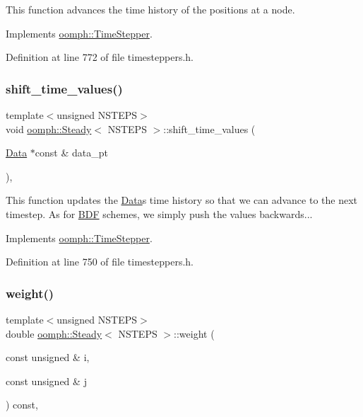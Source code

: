 This function advances the time history of the positions at a node. 



Implements \hyperlink{classoomph_1_1TimeStepper_a518b1bee5dc3aae8c5ef13560d1954ac}{oomph\+::\+Time\+Stepper}.



Definition at line 772 of file timesteppers.\+h.

\mbox{\label{classoomph_1_1Steady_aa1c00b0014a2394f7b2e1b302ebbce00}} 
\subsubsection{\texorpdfstring{shift\+\_\+time\+\_\+values()}{shift\_time\_values()}}
{\footnotesize\ttfamily template$<$unsigned N\+S\+T\+E\+PS$>$ \\
void \hyperlink{classoomph_1_1Steady}{oomph\+::\+Steady}$<$ N\+S\+T\+E\+PS $>$\+::shift\+\_\+time\+\_\+values (\begin{DoxyParamCaption}\item[{\hyperlink{classoomph_1_1Data}{Data} $\ast$const \&}]{data\+\_\+pt }\end{DoxyParamCaption})\hspace{0.3cm}{\ttfamily [inline]}, {\ttfamily [virtual]}}



This function updates the \hyperlink{classoomph_1_1Data}{Data}\textquotesingle{}s time history so that we can advance to the next timestep. As for \hyperlink{classoomph_1_1BDF}{B\+DF} schemes, we simply push the values backwards... 



Implements \hyperlink{classoomph_1_1TimeStepper_a010a3b03a23a1c48dd8ca10641427255}{oomph\+::\+Time\+Stepper}.



Definition at line 750 of file timesteppers.\+h.

\mbox{\label{classoomph_1_1Steady_a34c993309f0a5c4c1cbf35ceef86f01b}} 
\subsubsection{\texorpdfstring{weight()}{weight()}}
{\footnotesize\ttfamily template$<$unsigned N\+S\+T\+E\+PS$>$ \\
double \hyperlink{classoomph_1_1Steady}{oomph\+::\+Steady}$<$ N\+S\+T\+E\+PS $>$\+::weight (\begin{DoxyParamCaption}\item[{const unsigned \&}]{i,  }\item[{const unsigned \&}]{j }\end{DoxyParamCaption}) const\hspace{0.3cm}{\ttfamily [inline]}, {\ttfamily [virtual]}}



